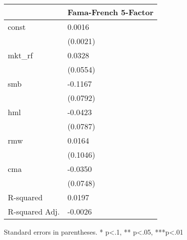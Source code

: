 \begin{table}
\caption{}
\label{}
\begin{center}
\begin{tabular}{ll}
\hline
               & Fama-French 5-Factor  \\
\hline
const          & 0.0016                \\
               & (0.0021)              \\
mkt\_rf        & 0.0328                \\
               & (0.0554)              \\
smb            & -0.1167               \\
               & (0.0792)              \\
hml            & -0.0423               \\
               & (0.0787)              \\
rmw            & 0.0164                \\
               & (0.1046)              \\
cma            & -0.0350               \\
               & (0.0748)              \\
R-squared      & 0.0197                \\
R-squared Adj. & -0.0026               \\
\hline
\end{tabular}
\end{center}
\end{table}
\bigskip
Standard errors in parentheses. \newline 
* p<.1, ** p<.05, ***p<.01
